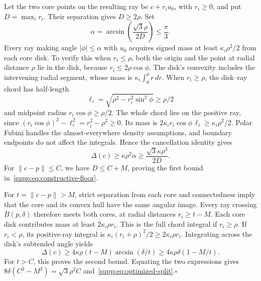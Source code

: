 Let the two core points on the resulting ray be $c+r_iu_0$, with $r_i\geq0$, and put $D=\max_i r_i$. Their separation gives $D\geq2\rho$. Set
\[
 \alpha=\arcsin\left(\frac{\sqrt3\rho}{2D}\right)\leq\frac\pi3.
\]
Every ray making angle $|\phi|\leq\alpha$ with $u_0$ acquires signed mass at least $\kappa_i\rho^2/2$ from each core disk. To verify this when $r_i\leq\rho$, both the origin and the point at radial distance $\rho$ lie in the disk, because $r_i\leq2\rho\cos\phi$. The disk's convexity includes the intervening radial segment, whose mass is $\kappa_i\int_0^\rho r\,dr$. When $r_i\geq\rho$, the disk--ray chord has half-length
\[
 \ell_i=\sqrt{\rho^2-r_i^2\sin^2\phi}\geq\rho/2
\]
and midpoint radius $r_i\cos\phi\geq\rho/2$. The whole chord lies on the positive ray, since $(r_i\cos\phi)^2-\ell_i^2=r_i^2-\rho^2\geq0$. Its mass is $2\kappa_i r_i\cos\phi\,\ell_i\geq\kappa_i\rho^2/2$. Polar Fubini handles the almost-everywhere density assumptions, and boundary endpoints do not affect the integrals. Hence the cancellation identity gives
\begin{equation}
 \Delta(c)\geq\kappa\rho^2\alpha
             \geq\frac{\sqrt3\kappa\rho^3}{2D}.
 \label{supp:eq:compact-core-floor}
\end{equation}
For $\|c-p\|\leq C$, we have $D\leq C+M$, proving the first bound in~\eqref{supp:eq:constructive-floor}.

For $t=\|c-p\|>M$, strict separation from each core and connectedness imply that the core and its convex hull have the same angular image. Every ray crossing $B(p,\delta)$ therefore meets both cores, at radial distances $r_i\geq t-M$. Each core disk contributes mass at least $2\kappa_i\rho r_i$. This is the full chord integral if $r_i\geq\rho$. If $r_i<\rho$, its positive-ray integral is $\kappa_i(r_i+\rho)^2/2\geq2\kappa_i\rho r_i$. Integrating across the disk's subtended angle yields
\[
 \Delta(c)\geq4\kappa\rho(t-M)\arcsin(\delta/t)
 \geq4\kappa\rho\delta(1-M/t).
\]
For $t>C$, this proves the second bound. Equating the two expressions gives $8\delta(C^2-M^2)=\sqrt3\rho^2C$ and~\eqref{supp:eq:optimized-split}.\hfill$\square$

